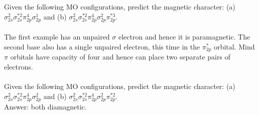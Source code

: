 \documentclass[main.tex]{subfiles}
\begin{document}
\begin{description}
\begin{example} %
Given the following MO configurations, predict the magnetic character: (a) $\sigma^{2}_{2s}\sigma^{*2}_{2s}\pi^{4}_{2p}\sigma^{1}_{2p}$ and (b) $\sigma^{2}_{2s}\sigma^{*2}_{2s}\pi^{4}_{2p}\sigma^{2}_{2p}\pi^{*3}_{2p}$. \\ 
\\
The first example has an unpaired $\sigma$ electron and hence it is paramagnetic. The second base also has a single unpaired electron, this time in the $\pi^{*}_{2p}$ orbital. Mind $\pi$ orbitals have capacity of four and hence can place two separate pairs of electrons.  
\\
\faDiamond\ \\
Given the following MO configurations, predict the magnetic character: (a) $\sigma^{2}_{2s}\sigma^{*2}_{2s}\pi^{4}_{2p}\sigma^{2}_{2p}$ and (b) $\sigma^{2}_{2s}\sigma^{*2}_{2s}\pi^{4}_{2p}\sigma^{2}_{2p}\pi^{*2}_{2p}$.\\
\flushright Answer: both diamagnetic.
\end{example}%





\end{description}
\end{document}

